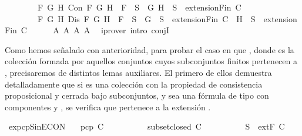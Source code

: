 \begin{isabellebody}
\ \ \ \ \ \ \ \ {\isacharparenleft}{\isasymforall}F\ G\ H{\isachardot}\ Con\ F\ G\ H\ {\isasymlongrightarrow}\ F\ {\isasymin}\ S\ {\isasymlongrightarrow}\ {\isacharbraceleft}G{\isacharcomma}\ H{\isacharbraceright}\ {\isasymunion}\ S\ {\isasymin}\ {\isacharparenleft}extensionFin\ C{\isacharparenright}{\isacharparenright}\ {\isasymand}\isanewline
\ \ \ \ \ \ \ \ {\isacharparenleft}{\isasymforall}F\ G\ H{\isachardot}\ Dis\ F\ G\ H\ {\isasymlongrightarrow}\ F\ {\isasymin}\ S\ {\isasymlongrightarrow}\ {\isacharbraceleft}G{\isacharbraceright}\ {\isasymunion}\ S\ {\isasymin}\ {\isacharparenleft}extensionFin\ C{\isacharparenright}\ {\isasymor}\ {\isacharbraceleft}H{\isacharbraceright}\ {\isasymunion}\ S\ {\isasymin}\ {\isacharparenleft}extensionFin\ C{\isacharparenright}{\isacharparenright}{\isachardoublequoteclose}\isanewline
\ \ \ \ \isamarkupfalse%
\ A{}\ A{}\ A{}\ A{}\ \isamarkupfalse%
\ {\isacharparenleft}iprover\ intro{\isacharcolon}\ conjI{\isacharparenright}\isanewline
{}\isamarkupfalse%
%
\endisatagproof
{\isafoldproof}%
%
\isadelimproof
%
\endisadelimproof
%
\begin{isamarkuptext}%
Como hemos señalado con anterioridad, para probar el caso en que , donde  es la 
  colección formada por aquellos conjuntos cuyos subconjuntos finitos pertenecen a , precisaremos 
  de distintos lemas auxiliares. El primero de ellos demuestra detalladamente que si  es una
  colección con la propiedad de consistencia proposicional y cerrada bajo subconjuntos, 
  y sea  una fórmula de tipo \isa{{\isasymalpha}} con componentes  y , se verifica que  
  pertenece a la extensión .%
\end{isamarkuptext}\isamarkuptrue%
\isamarkupfalse%
\ ex{}{\isacharunderscore}pcp{\isacharunderscore}SinE{\isacharunderscore}CON{\isacharcolon}\isanewline
\ \ \ {\isachardoublequoteopen}pcp\ C{\isachardoublequoteclose}\isanewline
\ \ \ \ \ \ \ \ \ \ {\isachardoublequoteopen}subset{\isacharunderscore}closed\ C{\isachardoublequoteclose}\isanewline
\ \ \ \ \ \ \ \ \ \ {\isachardoublequoteopen}S\ {\isasymin}\ {\isacharparenleft}extF\ C{\isacharparenright}{\isachardoublequoteclose}\isanewline

\end{isabellebody}
